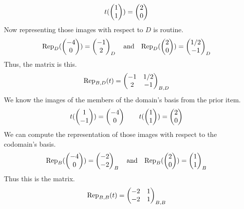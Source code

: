 \begin{exercises}
\begin{answer}
\begin{exparts}
\begin{equation*}
            t(\colvec{1 \\ 1})=\colvec{2 \\ 0}
          \end{equation*}
          Now representing those images with respect to $D$ is routine.
          \begin{equation*}
            \rep{\colvec{-4 \\ 0}}{D}=\colvec{-1 \\ 2}_D
            \quad\text{and}\quad
            \rep{\colvec{2 \\ 0}}{D}=\colvec{1/2 \\ -1}_D
          \end{equation*}
          Thus, the matrix is this.
          \begin{equation*}
            \rep{t}{B,D}=
            \begin{pmatrix}
              -1  &1/2  \\
               2  &-1
            \end{pmatrix}_{B,D}
          \end{equation*}
        \partsitem We know the images of the members of the domain's basis
          from the prior item.
          \begin{equation*}
             t(\colvec{1 \\ -1})=\colvec{-4 \\ 0}
             \qquad
             t(\colvec{1 \\ 1})=\colvec{2 \\ 0}
          \end{equation*}
          We can  compute the representation of those images with respect to
          the codomain's basis.
          \begin{equation*}
             \rep{\colvec{-4 \\ 0}}{B}=\colvec{-2 \\ -2}_B
             \quad\text{and}\quad
             \rep{\colvec{2 \\ 0}}{B}=\colvec{1 \\ 1}_B
          \end{equation*}
          Thus this is the matrix.
          \begin{equation*}
            \rep{t}{B,B}=
            \begin{pmatrix}
              -2  &1  \\
              -2  &1
            \end{pmatrix}_{B,B}
          \end{equation*}

\end{exparts}
\end{answer}
\end{exercises}
